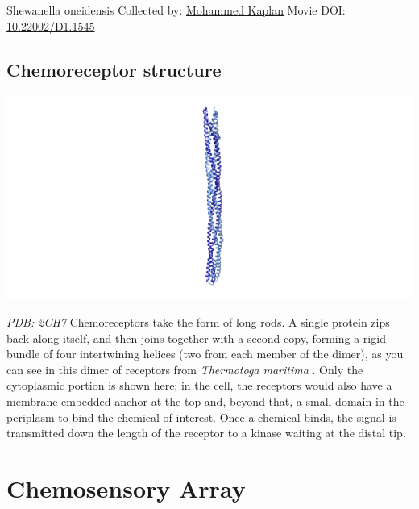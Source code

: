 \documentclass[]{tufte-book}
\begin{document}
\hypertarget{htmlwidget-2e01132e33718eb7b848}{}

\label{fig:7-1}Shewanella oneidensis Collected by: \protect\hyperlink{mohammed_kaplan}{Mohammed Kaplan} Movie DOI: \href{https://doi.org/10.22002/D1.1545}{10.22002/D1.1545}

\hypertarget{Chemoreceptor_structure}{%
\subsection{Chemoreceptor structure}\label{Chemoreceptor_structure}}

\includegraphics{img/schematics/7_1_1}

\emph{PDB: 2CH7}
Chemoreceptors take the form of long rods. A single protein zips back along itself, and then joins together with a second copy, forming a rigid bundle of four intertwining helices (two from each member of the dimer), as you can see in this dimer of receptors from \emph{Thermotoga maritima} \citep{park2006}. Only the cytoplasmic portion is shown here; in the cell, the receptors would also have a membrane-embedded anchor at the top and, beyond that, a small domain in the periplasm to bind the chemical of interest. Once a chemical binds, the signal is transmitted down the length of the receptor to a kinase waiting at the distal tip.

\hypertarget{chemosensory-array}{%
\section{Chemosensory Array}\label{chemosensory-array}}
\end{document}
